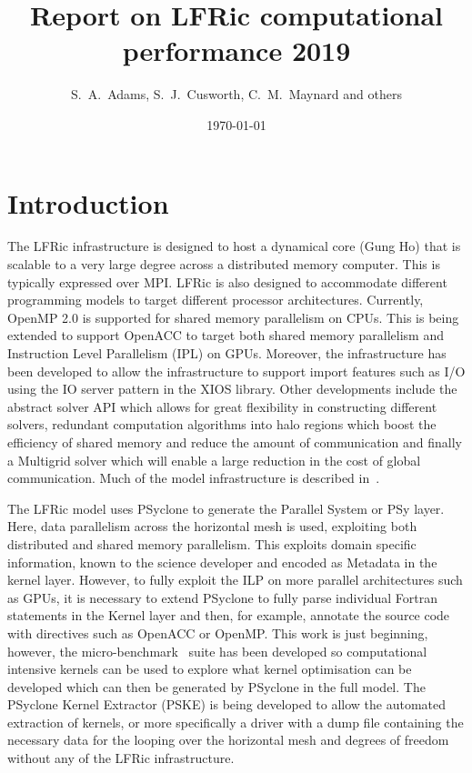 \documentclass[11pt]{article}
\author{S.~A.~Adams, S.~J.~Cusworth, C.~M.~Maynard and others}
\title{Report on LFRic computational performance 2019}
\date{\today}
\begin{document}
\maketitle
\medskip
\section{Introduction\label{sec:intro}}
The LFRic infrastructure is designed to host a dynamical core (Gung Ho)
that is scalable to a very large degree across a distributed memory
computer. This is typically expressed over MPI. LFRic is also designed
to accommodate different programming models to target different
processor architectures. Currently, OpenMP 2.0 is supported for shared
memory parallelism on CPUs. This is being extended to support OpenACC
to target both shared memory parallelism and Instruction Level
Parallelism (IPL) on GPUs. Moreover, the infrastructure has been
developed to allow the infrastructure to support import features such
as I/O using the IO server pattern in the XIOS library. Other
developments include the abstract solver API which allows for great
flexibility in constructing different solvers, redundant computation
algorithms into halo regions which boost the efficiency of shared
memory and reduce the amount of communication and finally a Multigrid
solver which will enable a large reduction in the cost of global communication.
Much of the model infrastructure is described in~\cite{LFRic}.

The LFRic model uses PSyclone to generate the Parallel System or PSy
layer. Here, data parallelism across the horizontal mesh is used,
exploiting both distributed and shared memory parallelism. This
exploits domain specific information, known to the science developer
and encoded as Metadata in the kernel layer. However, to
fully exploit the ILP on more parallel architectures such as GPUs, it
is necessary to extend PSyclone to fully parse individual Fortran
statements in the Kernel layer and then, for example, annotate the
source code with directives such as OpenACC or OpenMP. This work is just beginning,
however, the micro-benchmark~\cite{lfric-microbenchmarks} suite has been developed so computational
intensive kernels can be used to explore what kernel optimisation can
be developed which can then be generated by PSyclone in the full
model. The PSyclone Kernel Extractor (PSKE) is being developed to
allow the automated extraction of kernels, or more specifically a
driver with a dump file containing the necessary data for the looping
over the horizontal mesh and degrees of freedom without any of the
LFRic infrastructure.
\end{document}
